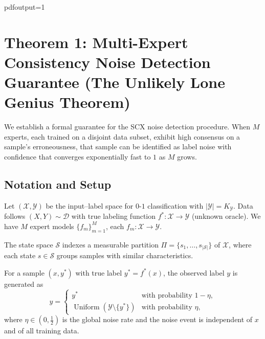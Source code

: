 pdfoutput=1

\section{Theorem 1: Multi-Expert Consistency Noise Detection Guarantee (The Unlikely Lone Genius Theorem)}
\label{sec:thm1}

We establish a formal guarantee for the SCX noise detection procedure. When $M$
experts, each trained on a disjoint data subset, exhibit high consensus on a
sample's erroneousness, that sample can be identified as label noise with
confidence that converges exponentially fast to $1$ as $M$ grows.

\subsection{Notation and Setup}
\label{sec:thm1:setup}

Let $(\mathcal{X},\mathcal{Y})$ be the input--label space for
$0$-$1$ classification with $|\mathcal{Y}| = K_{\mathcal{Y}}$.
Data follows $(X,Y) \sim \mathcal{D}$ with true labeling function
$f^* : \mathcal{X} \to \mathcal{Y}$ (unknown oracle). We have $M$ expert models
$\{f_m\}_{m=1}^M$, each $f_m : \mathcal{X} \to \mathcal{Y}$.

The state space $\mathcal{S}$ indexes a measurable partition
$\Pi = \{s_1,\dots,s_{|\mathcal{S}|}\}$ of $\mathcal{X}$, where each state
$s \in \mathcal{S}$ groups samples with similar characteristics.

\begin{definition}
\label{def:noise-model}
For a sample $(x, y^*)$ with true label $y^* = f^*(x)$, the observed label $y$ is
generated as
\begin{equation}
y = \begin{cases}
y^* & \text{with probability } 1 - \eta, \\[4pt]
\operatorname{Uniform}(\mathcal{Y} \setminus \{y^*\}) & \text{with probability } \eta,
\end{cases}
\label{eq:noise-model}
\end{equation}
where $\eta \in (0, \tfrac12)$ is the global noise rate and the noise event is
independent of $x$ and of all training data.
\end{definition}


